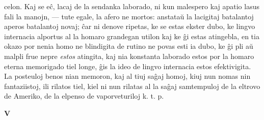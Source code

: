 celon. Kaj se e\^c, lacaj de la sendanka laborado, ni kun malespero
kaj apatio lasus fali la manojn, --- tute egale, la afero ne mortos:
anstata\u u la lacigitaj batalantoj aperos batalantoj novaj; \^car
ni denove ripetas, ke se estas ekster dubo, ke lingvo internacia
alportus al la homaro grandegan utilon kaj ke \^gi estas atingebla,
en tia okazo por nenia homo ne blindigita de rutino ne povas esti ia
dubo, ke \^gi pli a\u u malpli frue nepre {\sl estos} atingita, kaj
nia konstanta laborado estos por la homaro eterna memorigado tiel
longe, \^gis la ideo de lingvo internacia estos efektivigita. La
posteuloj benos nian memoron, kaj al tiuj sa\^gaj homoj, kiuj nun
nomas nin fantaziistoj, ili rilatos tiel, kiel ni nun rilatas al la
sa\^gaj samtempuloj de la eltrovo de Ameriko, de la elpenso de
vaporveturiloj k. t. p.

\begin{center}
\textbf{V}
\end{center}


